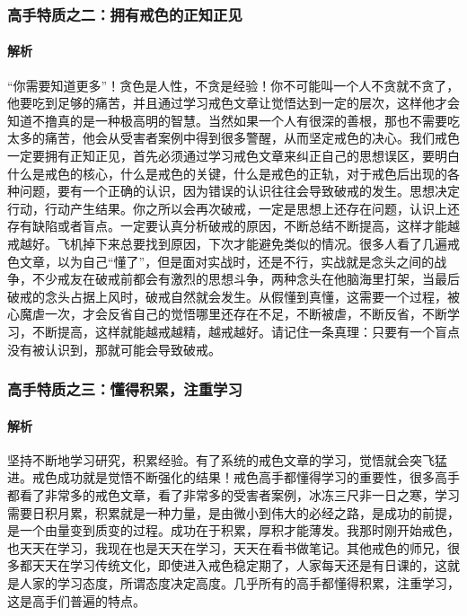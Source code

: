 \subsubsection{高手特质之二：拥有戒色的正知正见}

\paragraph{解析} “你需要知道更多”！贪色是人性，不贪是经验！你不可能叫一个人不贪就不贪了，他要吃到足够的痛苦，并且通过学习戒色文章让觉悟达到一定的层次，这样他才会知道不撸真的是一种极高明的智慧。当然如果一个人有很深的善根，那也不需要吃太多的痛苦，他会从受害者案例中得到很多警醒，从而坚定戒色的决心。我们戒色一定要拥有正知正见，首先必须通过学习戒色文章来纠正自己的思想误区，要明白什么是戒色的核心，什么是戒色的关键，什么是戒色的正轨，对于戒色后出现的各种问题，要有一个正确的认识，因为错误的认识往往会导致破戒的发生。思想决定行动，行动产生结果。你之所以会再次破戒，一定是思想上还存在问题，认识上还存有缺陷或者盲点。一定要认真分析破戒的原因，不断总结不断提高，这样才能越戒越好。飞机掉下来总要找到原因，下次才能避免类似的情况。很多人看了几遍戒色文章，以为自己“懂了”，但是面对实战时，还是不行，实战就是念头之间的战争，不少戒友在破戒前都会有激烈的思想斗争，两种念头在他脑海里打架，当最后破戒的念头占据上风时，破戒自然就会发生。从假懂到真懂，这需要一个过程，被心魔虐一次，才会反省自己的觉悟哪里还存在不足，不断被虐，不断反省，不断学习，不断提高，这样就能越戒越精，越戒越好。请记住一条真理：只要有一个盲点没有被认识到，那就可能会导致破戒。

\subsubsection{高手特质之三：懂得积累，注重学习}

\paragraph{解析} 坚持不断地学习研究，积累经验。有了系统的戒色文章的学习，觉悟就会突飞猛进。戒色成功就是觉悟不断强化的结果！戒色高手都懂得学习的重要性，很多高手都看了非常多的戒色文章，看了非常多的受害者案例，冰冻三尺非一日之寒，学习需要日积月累，积累就是一种力量，是由微小到伟大的必经之路，是成功的前提，是一个由量变到质变的过程。成功在于积累，厚积才能薄发。我那时刚开始戒色，也天天在学习，我现在也是天天在学习，天天在看书做笔记。其他戒色的师兄，很多都天天在学习传统文化，即使进入戒色稳定期了，人家每天还是有日课的，这就是人家的学习态度，所谓态度决定高度。几乎所有的高手都懂得积累，注重学习，这是高手们普遍的特点。

